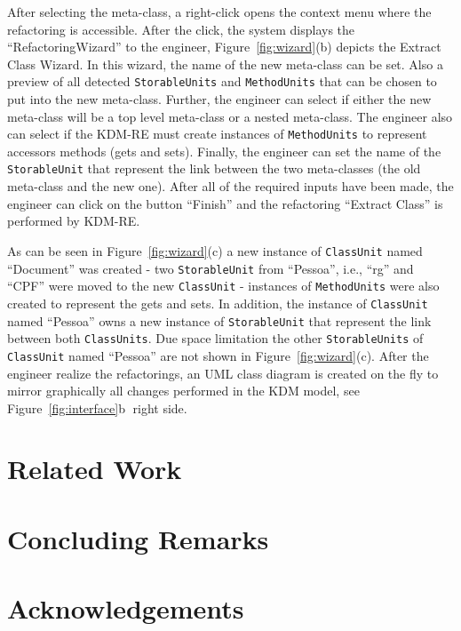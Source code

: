 \documentclass[12pt]{article}
\begin{document}
After selecting the meta-class, a right-click opens the context menu where the refactoring is accessible. After the click, the system displays the ``RefactoringWizard'' to the engineer, Figure~\ref{fig:wizard}(b) depicts the Extract Class Wizard. In this wizard, the name of the new meta-class can be set. Also a preview of all detected \texttt{StorableUnits} and \texttt{MethodUnits} that can be chosen to put into the new meta-class. Further, the engineer can select if either the new meta-class will be a top level meta-class or a nested meta-class. The engineer also can select if the KDM-RE must create instances of \texttt{MethodUnits} to represent accessors methods (gets and sets). Finally, the engineer can set the name of the \texttt{StorableUnit} that represent the link between the two meta-classes (the old meta-class and the new one). After all of the required inputs have been made, the engineer can click on the button ``Finish'' and the refactoring ``Extract Class'' is performed by KDM-RE. 

As can be seen in Figure~\ref{fig:wizard}(c) a new instance of \texttt{ClassUnit} named ``Document'' was created - two \texttt{StorableUnit} from ``Pessoa'', i.e., ``rg'' and ``CPF'' were moved to the new \texttt{ClassUnit} - instances of \texttt{MethodUnits} were also created to represent the gets and sets. In addition, the instance of \texttt{ClassUnit} named ``Pessoa'' owns a new instance of \texttt{StorableUnit} that represent the link between both \texttt{ClassUnits}. Due space limitation the other \texttt{StorableUnits} of \texttt{ClassUnit} named ``Pessoa'' are not shown in Figure~\ref{fig:wizard}(c). After the engineer realize the refactorings, an UML class diagram is created on the fly to mirror graphically all changes performed in the KDM model, see Figure~\ref{fig:interface}\textcircled{b} right side. %


\section{Related Work\label{sec:related}}
 

\section{Concluding Remarks\label{sec:conclusion}}
 

\section{Acknowledgements}~\label{sec:ack}
 



\end{document}
